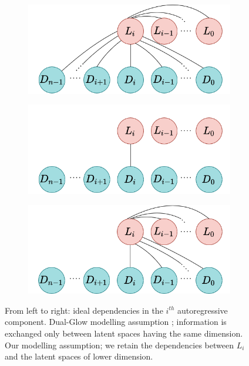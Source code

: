 \begin{figure}[t]
\centering
   \begin{subfigure}{0.31\textwidth}
		\includegraphics[width=\textwidth]{Chapter1/figures/fulldependencies.png}
	\end{subfigure}%
	\quad
\begin{subfigure}{0.31\textwidth}
	\includegraphics[width=\textwidth]{Chapter1/figures/Dual-Glowdependencies.png} 
\end{subfigure}%
\quad 
\begin{subfigure}{0.31\textwidth}
	\includegraphics[width=\textwidth]{Chapter1/figures/oursdependencies.png}
	\end{subfigure}
\caption{From left to right: ideal dependencies in the $i^{th}$ autoregressive component. Dual-Glow modelling assumption \cite{Dual-Glow}; information is exchanged only between latent spaces having the same dimension. Our modelling assumption; we retain the dependencies between $L_i$ and the latent spaces of lower dimension.}	\label{ch1:fig:dependencies}
\end{figure}

